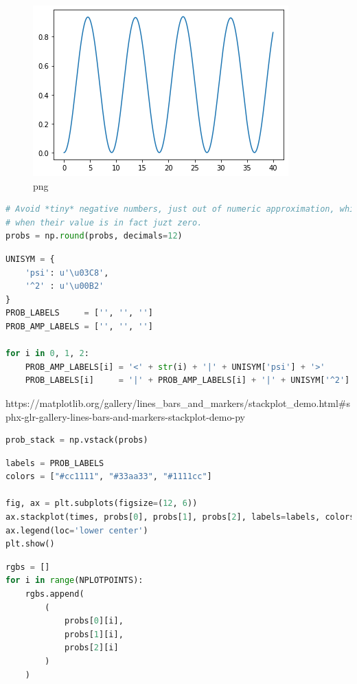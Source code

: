 \begin{figure}
\centering
\includegraphics[width=0.666\linewidth]{tex/appendix/nb/jupyter/3lev/output_13_2.png}
\caption{png}
\end{figure}

\begin{lstlisting}[language=Python]
# Avoid *tiny* negative numbers, just out of numeric approximation, which will cause problems later,
# when their value is in fact juzt zero.
probs = np.round(probs, decimals=12)
\end{lstlisting}

\begin{lstlisting}[language=Python]
UNISYM = {
    'psi': u'\u03C8',
    '^2' : u'\u00B2'
}
PROB_LABELS     = ['', '', '']
PROB_AMP_LABELS = ['', '', '']
                
for i in 0, 1, 2:
    PROB_AMP_LABELS[i] = '<' + str(i) + '|' + UNISYM['psi'] + '>'
    PROB_LABELS[i]     = '|' + PROB_AMP_LABELS[i] + '|' + UNISYM['^2']
\end{lstlisting}

https://matplotlib.org/gallery/lines\_bars\_and\_markers/stackplot\_demo.html\#sphx-glr-gallery-lines-bars-and-markers-stackplot-demo-py

\begin{lstlisting}[language=Python]
prob_stack = np.vstack(probs)
\end{lstlisting}

\begin{lstlisting}[language=Python]
labels = PROB_LABELS
colors = ["#cc1111", "#33aa33", "#1111cc"]

fig, ax = plt.subplots(figsize=(12, 6))
ax.stackplot(times, probs[0], probs[1], probs[2], labels=labels, colors=colors)
ax.legend(loc='lower center')
plt.show()
\end{lstlisting}

\begin{lstlisting}[language=Python]
rgbs = []
for i in range(NPLOTPOINTS):
    rgbs.append(
        (
            probs[0][i],
            probs[1][i],
            probs[2][i]
        )
    )
\end{lstlisting}

